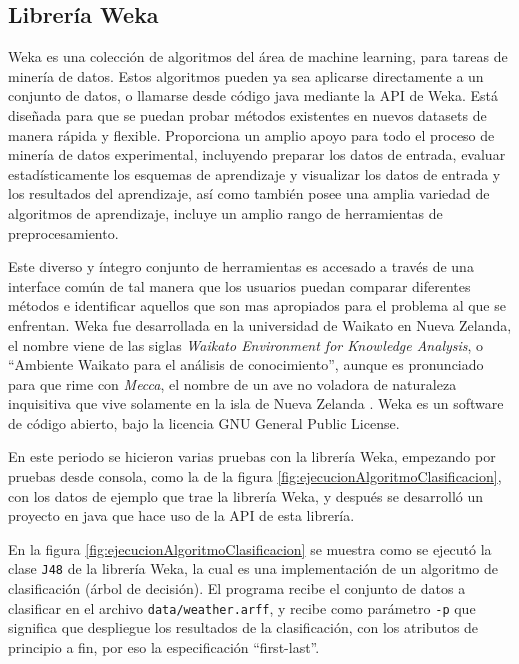 \subsection{Librería Weka}
Weka es una colección de algoritmos del área de machine learning, para tareas de minería de datos. Estos algoritmos pueden ya sea aplicarse directamente a un conjunto de datos, o llamarse desde código java mediante la API de Weka.
Está diseñada para que se puedan probar métodos existentes en nuevos datasets de manera rápida y flexible. Proporciona un amplio apoyo para todo el proceso de minería de datos experimental, incluyendo preparar los datos de entrada, evaluar estadísticamente los esquemas de aprendizaje y visualizar los datos de entrada y los resultados del aprendizaje, así como también posee una amplia variedad de algoritmos de aprendizaje, incluye un amplio rango de herramientas de preprocesamiento.

Este diverso y íntegro conjunto de herramientas es accesado a través de una interface común de tal manera que los usuarios puedan comparar diferentes métodos e identificar aquellos que son mas apropiados para el problema al que se enfrentan. Weka fue desarrollada en la universidad de Waikato en Nueva Zelanda, el nombre viene de las siglas \textit{Waikato  Environment for Knowledge Analysis}, o ``Ambiente Waikato para el análisis de conocimiento'', aunque es pronunciado para que rime con \textit{Mecca}, el nombre de un ave no voladora de naturaleza inquisitiva que vive solamente en la isla de Nueva Zelanda \cite{EibeFMarkAHallIanHTheWekaWorkbench}.
Weka es un software de código abierto, bajo la licencia GNU General Public License.

En este periodo se hicieron varias pruebas con la librería Weka, empezando por pruebas desde consola, como la de la figura \ref{fig:ejecucionAlgoritmoClasificacion}, con los datos de ejemplo que trae la librería Weka, y después se desarrolló un proyecto en java que hace uso de la API de esta librería.

En la figura \ref{fig:ejecucionAlgoritmoClasificacion} se muestra como se ejecutó la clase \texttt{J48} de la librería Weka, la cual es una implementación de un algoritmo de clasificación (árbol de decisión). 
El programa recibe el conjunto de datos a clasificar en el archivo \texttt{data/weather.arff}, y recibe como parámetro \texttt{-p} que significa que despliegue los resultados de la clasificación, con los atributos de principio a fin, por eso la especificación ``first-last''.

